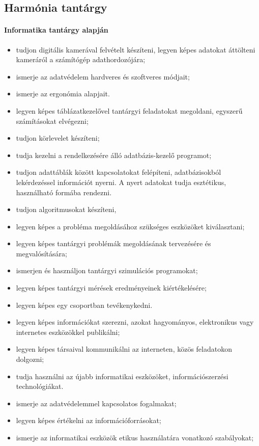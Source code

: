 \subsection{Harmónia tantárgy}
\paragraph{Informatika tantárgy alapján}
\begin{itemize}
\item tudjon digitális kamerával felvételt készíteni, legyen képes adatokat áttölteni kameráról a számítógép adathordozójára;
\item ismerje az adatvédelem hardveres és szoftveres módjait;
\item ismerje az ergonómia alapjait.
\item legyen képes táblázatkezelővel tantárgyi feladatokat megoldani, egyszerű számításokat elvégezni;
\item tudjon körlevelet készíteni;
\item tudja kezelni a rendelkezésére álló adatbázis-kezelő programot;
\item tudjon adattáblák között kapcsolatokat felépíteni, adatbázisokból lekérdezéssel információt nyerni. A nyert adatokat tudja esztétikus, használható formába rendezni.
\item tudjon algoritmusokat készíteni,
\item legyen képes a probléma megoldásához szükséges eszközöket kiválasztani;
\item legyen képes tantárgyi problémák megoldásának tervezésére és megvalósítására;
\item ismerjen és használjon tantárgyi szimulációs programokat;
\item legyen képes tantárgyi mérések eredményeinek kiértékelésére;
\item legyen képes egy csoportban tevékenykedni.
\item legyen képes információkat szerezni, azokat hagyományos, elektronikus vagy internetes eszközökkel publikálni;
\item legyen képes társaival kommunikálni az interneten, közös feladatokon dolgozni;
\item tudja használni az újabb informatikai eszközöket, információszerzési technológiákat.
\item ismerje az adatvédelemmel kapcsolatos fogalmakat;
\item legyen képes értékelni az információforrásokat;
\item ismerje az informatikai eszközök etikus használatára vonatkozó szabályokat;

\end{itemize}
